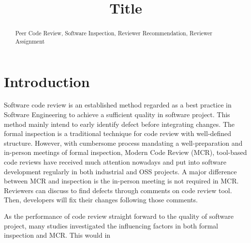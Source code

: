 \documentclass[conference]{IEEEtran}
\begin{document}
\title{Title}

\maketitle
{}
{\newcommand{\nbnote}[2]{
  \fcolorbox{blue}{yellow}{\bfseries\sffamily\scriptsize#1}
  {\sf\small\textit{#2}}
 }
}
{\newcommand{\nbnote}[2]{}
 \newcommand{\version}{}
}
\newcommand\pick[1]{\nbnote{Pick sez}{\textcolor{magenta}{#1}}}
\newcommand\thai[1]{\nbnote{Thai sez}{\textcolor{blue}{#1}}}


\begin{abstract}




\begin{IEEEkeywords}
Peer Code Review, Software Inspection, Reviewer Recommendation, Reviewer Assignment
\end{IEEEkeywords}
\end{abstract}

\section{Introduction}
Software code review is an established method regarded as a best practice in Software Engineering to achieve a sufficient quality in software project. This method mainly intend to early identify defect before integrating changes. The formal inspection\cite{Fagan:1976:DCI:1661010.1661012} is a traditional technique for code review with well-defined structure.
However, with cumbersome process mandating a well-preparation and in-person meetings of formal inspection, Modern Code Review (MCR)\cite{Bacchelli2013a}, tool-based code reviews have received much attention nowadays and  put into software development regularly in both industrial and OSS projects. A major difference between MCR and inspection is the in-person meeting is not required in MCR. Reviewers can discuss to find defects through comments on code review tool. Then, developers will fix their changes following those comments.

As the performance of code review straight forward to the quality of software project, many studies investigated the influencing factors in both formal inspection\cite{Porter1998} \pick{and other papers}and MCR\cite{Mcintosh,Beller,Rigby,Hamasaki2013,Baysal2001}. This would in
\end{document}
